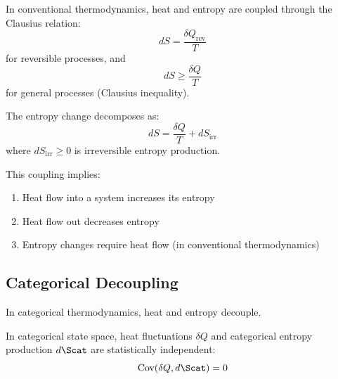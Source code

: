 In conventional thermodynamics, heat and entropy are coupled through the Clausius relation:
\begin{equation}
dS = \frac{\delta Q_{\text{rev}}}{T}
\label{eq:clausius}
\end{equation}
for reversible processes, and
\begin{equation}
dS \geq \frac{\delta Q}{T}
\label{eq:clausius_inequality}
\end{equation}
for general processes (Clausius inequality).

The entropy change decomposes as:
\begin{equation}
dS = \frac{\delta Q}{T} + dS_{\text{irr}}
\label{eq:entropy_decomposition}
\end{equation}
where $dS_{\text{irr}} \geq 0$ is irreversible entropy production.

This coupling implies:
\begin{enumerate}
    \item Heat flow into a system increases its entropy
    \item Heat flow out decreases entropy
    \item Entropy changes require heat flow (in conventional thermodynamics)
\end{enumerate}

\subsection{Categorical Decoupling}

In categorical thermodynamics, heat and entropy decouple.

\begin{theorem}
\label{thm:decoupling}
In categorical state space, heat fluctuations $\delta Q$ and categorical entropy production $d\Scat$ are statistically independent:
\begin{equation}
\text{Cov}(\delta Q, d\Scat) = 0
\label{eq:covariance_zero}
\end{equation}
\end{theorem}

